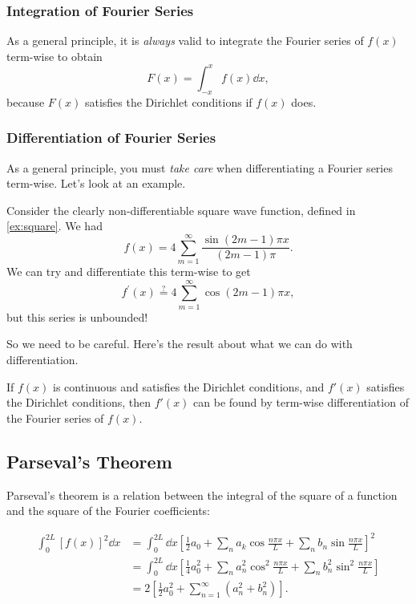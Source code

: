 \documentclass[a4paper]{scrartcl}
\begin{document}
\subsubsection*{Integration of Fourier Series}

As a general principle, it is \emph{always} valid to integrate the Fourier series of $f(x)$ term-wise to obtain
$$
F(x) = \int_{-x}^x f(x) \dd x,
$$
because $F(x)$ satisfies the Dirichlet conditions if $f(x)$ does. 

\subsubsection*{Differentiation of Fourier Series}

As a general principle, you must \emph{take care} when differentiating a Fourier series term-wise. Let's look at an example.

\begin{example}
    Consider the clearly non-differentiable square wave function, defined in \autoref{ex:square}. We had
    $$
    f(x)=4 \sum_{m=1}^{\infty} \frac{\sin (2 m-1) \pi x}{(2 m-1) \pi}.
    $$
    We can try and differentiate this term-wise to get
    $$
    f^{\prime}(x) \stackrel{?}{=} 4 \sum_{m=1}^{\infty} \cos (2 m-1) \pi x,
    $$
    but this series is unbounded!
\end{example}

So we need to be careful. Here's the result about what we can do with differentiation.

\begin{theorem}
    If $f(x)$ is continuous and satisfies the Dirichlet conditions, and $f'(x)$ satisfies the Dirichlet conditions, then $f'(x)$ can be found by term-wise differentiation of the Fourier series of $f(x)$.
\end{theorem}

\subsection{Parseval's Theorem}

Parseval's theorem is a relation between the integral of the square of a function and the square of the Fourier coefficients:

\begin{align*}
    \int_{0}^{2L}[f(x)]^{2} \dd x&=\int_{0}^{2 L} \dd x\left[\frac{1}{2} a_{0}+\sum_{n} a_{k} \cos \frac{n \pi x}{L}+\sum_{n} b_{n} \sin \frac{n \pi x}{L}\right]^{2} \\ 
&= \int_{0}^{2 L} \dd x\left[\frac{1}{4} a_{0}^{2}+\sum_{n} a_{n}^{2} \cos ^{2} \frac{n \pi x}{L}+\sum_{n} b_{n}^{2} \sin ^{2} \frac{n \pi x}{L}\right] \\
&= 2\left[\frac{1}{2} a_{0}^{2}+\sum_{n=1}^{\infty}\left(a_{n}^{2}+b_{n}^{2}\right)\right].
\end{align*}
\end{document}

